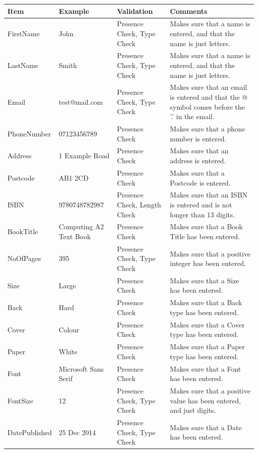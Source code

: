 \begin{center}
    \begin{tabular}{|p{2cm}|p{2cm}|p{2cm}|p{2cm}|}
    \textbf{Item} & \textbf{Example} & \textbf{Validation} & \textbf{Comments}\\ \hline
    FirstName & John & Presence Check, Type Check & Makes sure that a name is entered, and that the name is just letters. \\ \hline
    LastName & Smith & Presence Check, Type Check & Makes sure that a name is entered, and that the name is just letters. \\ \hline
    Email & test@mail.com & Presence Check, Type Check & Makes sure that an email is entered and that the @ symbol comes before the '.' in the email. \\ \hline
    PhoneNumber & 07123456789 & Presence Check & Makes sure that a phone number is entered. \\ \hline
    Address & 1 Example Road & Presence Check & Makes sure that an address is entered. \\ \hline
    Postcode & AB1 2CD & Presence Check & Makes sure that a Postcode is entered. \\ \hline
    ISBN & 9780748782987 & Presence Check, Length Check & Makes sure that an ISBN is entered and is not longer than 13 digits. \\ \hline
    BookTitle & Computing A2 Text Book & Presence Check & Makes sure that a Book Title has been entered. \\ \hline
    NoOfPages & 395 & Presence Check, Type Check & Makes sure that a positive integer has been entered. \\ \hline
    Size & Large & Presence Check & Makes sure that a Size has been entered. \\ \hline
    Back & Hard & Presence Check & Makes sure that a Back type has been entered. \\ \hline
    Cover & Colour & Presence Check & Makes sure that a Cover type has been entered. \\ \hline
    Paper & White & Presence Check & Makes sure that a Paper type has been entered. \\ \hline
    Font & Microsoft Sans Serif & Presence Check & Makes sure that a Font has been entered. \\ \hline
    FontSize & 12 & Presence Check, Type Check & Makes sure that a positive value has been entered, and just digits. \\ \hline
    DatePublished & 25 Dec 2014 & Presence Check, Type Check & Makes sure that a Date has been entered. \\ \hline

\end{tabular}
\end{center}
